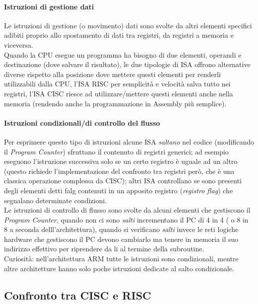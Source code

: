 \paragraph*{Istruzioni di gestione dati}
Le istruzioni di gestione (o movimento) dati sono svolte da altri elementi specifici adibiti proprio allo spostamento di dati tra registri, da registri a memoria  e viceversa.\\
Quando la CPU esegue un programma ha bisogno di due elementi, operandi e destinazione (dove salvare il risultato),  le due tipologie di ISA offrono alternative diverse rispetto alla posizione dove mettere questi elementi per renderli utilizzabili dalla CPU, l’ISA RISC per semplicità  e velocità salva tutto nei registri, l’ISA CISC riesce ad utilizzare/mettere questi elementi anche nella memoria (rendendo anche la programmazione in Assembly più semplice).
\paragraph*{Istruzioni condizionali/di controllo del flusso}
Per esprimere questo tipo di istruzioni alcune ISA \textit{saltano} nel codice (modificando il \textit{Program Counter}) sfruttano il contenuto di registri generici; ad esempio eseguono l’istruzione successiva solo se un certo registro è uguale ad un altro (questo richiede l’implementazione del confronto tra registri però, che è una classica operazione complessa da CISC); altri ISA controllano se sono presenti  degli elementi detti falg contenuti in un apposito registro (\textit{registro flag}) che segnalano determinate condizioni.\\
Le istruzioni di controllo di flusso sono svolte da alcuni elementi che gestiscono il \textit{Program Counter}, quando non ci sono \textit{salti} incrementano il PC di 4 in 4 ( o 8 in 8 a seconda delll’architettura), quando si verificano \textit{salti} invece le reti logiche hardware che gestiscono il PC devono cambiarlo ma tenere in memoria il suo indirizzo effettivo per riprendere da li al termine della subroutine.\\
Curiosità: nell'architettura ARM tutte le istruzioni sono condizionali, mentre altre architetture hanno solo poche istruzioni dedicate al salto condizionale.

\subsection{Confronto tra CISC e RISC}


